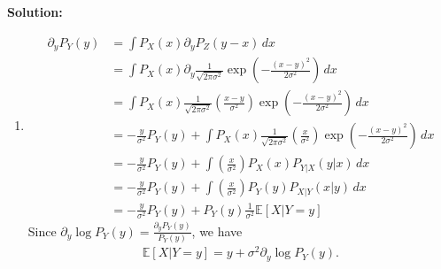 \documentclass[12pt]{article}
\newcommand{\fE}{\mathbb{E}}
\begin{document}
\begin{enumerate}
\begin{solution}
\textbf{Solution:}\\
\begin{enumerate}
    \item
    \begin{align}
        \partial_y P_Y(y) 
        &= \int P_X(x) \partial_y P_Z(y - x)\, dx \\
        &= \int P_X(x) \partial_y \frac{1}{\sqrt{2\pi\sigma^2}} \exp\left(-\frac{(x - y)^2}{2\sigma^2}\right)\, dx \\
        &= \int P_X(x) \frac{1}{\sqrt{2\pi\sigma^2}} \left(\frac{x - y}{\sigma^2}\right)\exp\left(-\frac{(x - y)^2}{2\sigma^2}\right)\, dx \\
        &= -\frac{y}{\sigma^2} P_Y(y) + \int P_X(x) \frac{1}{\sqrt{2\pi\sigma^2}} \left(\frac{x}{\sigma^2}\right)\exp\left(-\frac{(x - y)^2}{2\sigma^2}\right)\, dx \\
        &= -\frac{y}{\sigma^2} P_Y(y) + \int \left(\frac{x}{\sigma^2}\right) P_X(x) P_{Y|X}(y | x)\, dx \\
        &= -\frac{y}{\sigma^2} P_Y(y) + \int \left(\frac{x}{\sigma^2}\right) P_Y(y) P_{X|Y}(x | y)\, dx \\
        &= -\frac{y}{\sigma^2} P_Y(y) + P_Y(y) \frac{1}{\sigma^2} \fE[X | Y = y]
    \end{align}
    Since $\partial_y \log P_Y(y) = \frac{\partial_y P_Y(y)}{P_Y(y)}$, we have
    \begin{align}
        \fE[X | Y = y] = y + \sigma^2 \partial_y \log P_Y(y).
    \end{align}


\end{enumerate}
\end{solution}
\end{enumerate}
\end{document}
